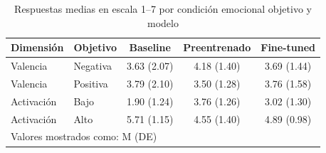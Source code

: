 \begin{table}[htbp]
\centering
\caption{Respuestas medias en escala 1--7 por condición emocional objetivo y modelo}
\label{tab:mean_responses}
\begin{tabular}{llccc}
\toprule
\textbf{Dimensión} & \textbf{Objetivo} & \textbf{Baseline} & \textbf{Preentrenado} & \textbf{Fine-tuned} \\
\midrule
Valencia & Negativa & 3.63 (2.07) & 4.18 (1.40) & 3.69 (1.44) \\
Valencia & Positiva & 3.79 (2.10) & 3.50 (1.28) & 3.76 (1.58) \\
\midrule
Activación & Bajo & 1.90 (1.24) & 3.76 (1.26) & 3.02 (1.30) \\
Activación & Alto & 5.71 (1.15) & 4.55 (1.40) & 4.89 (0.98) \\
\bottomrule
\multicolumn{5}{l}{\footnotesize Valores mostrados como: M (DE)} \\
\end{tabular}
\end{table}

